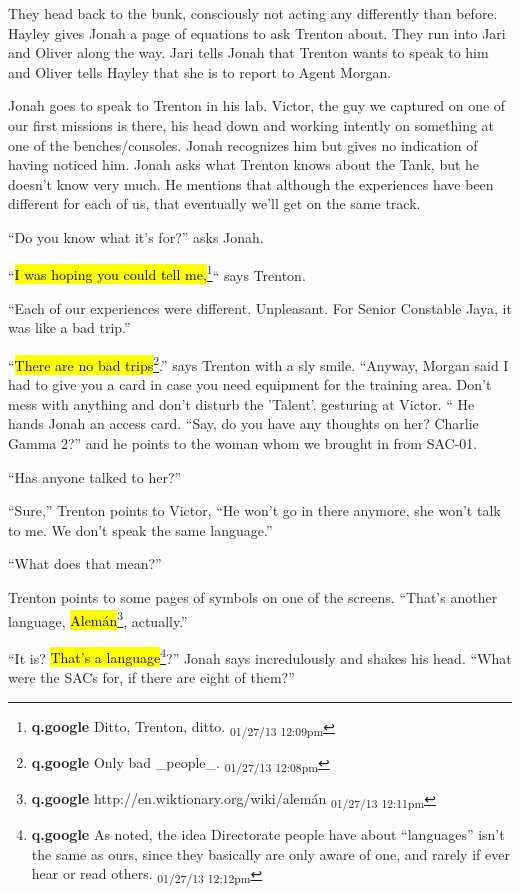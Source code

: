 They head back to the bunk, consciously not acting any differently than before.  Hayley gives Jonah a page of equations to ask Trenton about.  They run into Jari and Oliver along the way.  Jari tells Jonah that Trenton wants to speak to him and Oliver tells Hayley that she is to report to Agent Morgan.



Jonah goes to speak to Trenton in his lab.  Victor, the guy we captured on one of our first missions is there, his head down and working intently on something at one of the benches/consoles.  Jonah recognizes him but gives no indication of having noticed him.  Jonah asks what Trenton knows about the Tank, but he doesn't know very much.  He mentions that although the experiences have been different for each of us, that eventually we'll get on the same track.

``Do you know what it's for?'' asks Jonah.

``\hl{I was hoping you could tell me,}\footnote{\textbf{q.google }Ditto, Trenton, ditto. \textsubscript{01/27/13 12:09pm}}`` says Trenton.

``Each of our experiences were different.  Unpleasant.  For Senior Constable Jaya, it was like a bad trip.''

``\hl{There are no bad trips}\footnote{\textbf{q.google }Only bad \_people\_. \textsubscript{01/27/13 12:08pm}}.'' says Trenton with a sly smile.  ``Anyway, Morgan said I had to give you a card in case you need equipment for the training area.  Don't mess with anything and don't disturb the 'Talent'. gesturing at Victor. `` He hands Jonah an access card.  ``Say, do you have any thoughts on her? Charlie Gamma 2?'' and he points to the woman whom we brought in from SAC-01.

``Has anyone talked to her?''

``Sure,'' Trenton points to Victor, ``He won't go in there anymore, she won't talk to me.  We don't speak the same language.''

``What does that mean?''

Trenton points to some pages of symbols on one of the screens.  ``That's another language, \hl{Alemán}\footnote{\textbf{q.google }http://en.wiktionary.org/wiki/alemán \textsubscript{01/27/13 12:11pm}}, actually.''

``It is?  \hl{That's a language}\footnote{\textbf{q.google }As noted, the idea Directorate people have about ``languages'' isn't the same as ours, since they basically are only aware of one, and rarely if ever hear or read others. \textsubscript{01/27/13 12:12pm}}?'' Jonah says incredulously and shakes his head.  ``What were the SACs for, if there are eight of them?''

